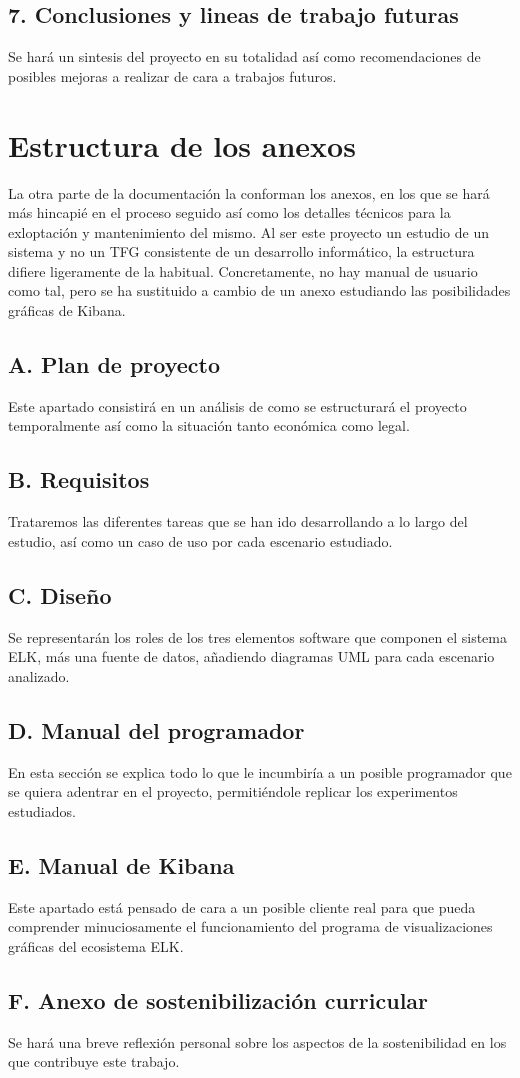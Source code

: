 \subsection{  7. Conclusiones y lineas de trabajo futuras}
Se hará un sintesis del proyecto en su totalidad así como recomendaciones de posibles mejoras a realizar de cara a trabajos futuros.

\section{Estructura de los anexos}
La otra parte de la documentación la conforman los anexos, en los que se hará más hincapié en el proceso seguido así como los detalles técnicos para la exloptación y mantenimiento del mismo. Al ser este proyecto un estudio de un sistema y no un TFG consistente de un desarrollo informático, la estructura difiere ligeramente de la habitual. Concretamente, no hay manual de usuario como tal, pero se ha sustituido a cambio de un anexo estudiando las posibilidades gráficas de Kibana.

  \subsection{  A. Plan de proyecto}
  Este apartado consistirá en un análisis de como se estructurará el proyecto temporalmente así como la situación tanto económica como legal.
  \subsection{  B. Requisitos}
  Trataremos las diferentes tareas que se han ido desarrollando a lo largo del estudio, así como un caso de uso por cada escenario estudiado.
  \subsection{  C. Diseño}
  Se representarán los roles de los tres elementos software que componen el sistema ELK, más una fuente de datos, añadiendo diagramas UML para cada escenario analizado.
  \subsection{  D. Manual del programador}
  En esta sección se explica todo lo que le incumbiría a un posible programador que se quiera adentrar en el proyecto, permitiéndole replicar los experimentos estudiados.
  \subsection{  E. Manual de Kibana}
  Este apartado está pensado de cara a un posible cliente real para que pueda comprender minuciosamente el funcionamiento del programa de visualizaciones gráficas del ecosistema ELK.
  \subsection{  F. Anexo de sostenibilización curricular }
     Se hará una breve reflexión personal sobre los aspectos de la sostenibilidad en los que contribuye este trabajo.




